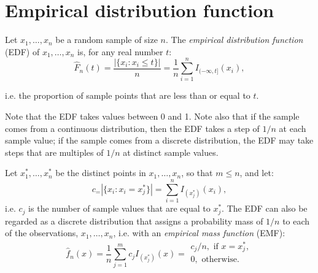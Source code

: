 
\section{Empirical distribution function}
\work

Let $x_1,\ldots,x_n$ be a random sample of size $n$. The {\it empirical distribution function} (EDF) of $x_1,\ldots,x_n$ is, for any real number $t$:
\begin{equation}
\hat{F}_n(t)=\frac{|\{x_i:x_i\leq t\}|}{n}=\frac{1}{n}\sum^n_{i=1}I_{(-\infty,t]}(x_i),
\end{equation}

i.e. the proportion of sample points that are less than or equal to $t$.

Note that the EDF takes values between 0 and 1. Note also that if the sample comes from a continuous distribution, then the EDF takes a step of $1/n$ at each sample value; if the sample comes from a discrete distribution, the EDF may take steps that are multiples of $1/n$ at distinct sample values.

Let $x_1^*,\ldots,x_n^*$ be the distinct points in $x_1,\ldots,x_n$, so that $m \leq n$, and let:
\begin{equation}
c_=|\{x_i:x_i=x_j^* \}|=\sum^n_{i=1}I_{(x_j^*)}(x_i),
\end{equation}
i.e. $c_j$ is the number of sample values that are equal to $x^*_j$. The EDF can also be regarded as a discrete distribution that assigns a probability mass of $1/n$ to each of the observations, $x_1,\ldots,x_n$, i.e. with an {\it empirical mass function} (EMF):
\begin{equation}
\hat{f}_n(x)=\frac{1}{n}\sum^m_{j=1}c_jI_{(x^*_j)}(x)=\begin{array}{l}
c_j/n,\textrm{    if }x=x^*_j,\\0,\textrm{    otherwise.}\\
\end{array}
\end{equation}
 
